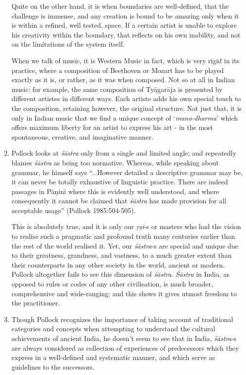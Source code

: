 \begin{enumerate}
Quite on the other hand, it is when boundaries are well-defined, that the challenge is immense, and any creation is bound to be amazing only when it is within a refined, well tested, space. If a certain artist is unable to explore his creativity within the boundary, that reflects on his own inability, and not on the limitations of the system itself. 

When we talk of music, it is Western Music in fact, which is very rigid in its practice, where a composition of Beethoven or Mozart has to be played exactly as it is, or rather, as it was when composed. Not so at all in Indian music: for example, the same composition of Tyāgarāja is presented by different artistes in different ways. Each artiste adds his own special touch to the composition, retaining however, the original structure. Not just that, it is only in Indian music that we find a unique concept of `{\it mano-dharma}' which offers maximum liberty for an artist to express his art - in the most spontaneous, creative, and imaginative manner. 

\item Pollock looks at {\it śāstra} only from a single and limited angle; and repeatedly blames {\it śāstra} as being too normative. Whereas, while speaking about grammar, he himself says ``...However detailed a descriptive grammar may be, it can never be totally exhaustive of linguistic practice. There are indeed passages in Pāṇini where this is evidently well understood, and where consequently it cannot be claimed that {\it śāstra} has made provision for all acceptable usage'' (Pollock 1985:504-505). 

This is absolutely true, and it is only our {\it ṛṣi}-s or masters who had the vision to realise such a pragmatic and profound truth many centuries earlier than the rest of the world realised it.  Yet, our {\it śāstra}-s are special and unique due to their greatness, grandness, and vastness, to a much greater extent than their counterparts in any other society in the world, ancient or modern. Pollock altogether fails to see this dimension of {\it śāstra}. {\it Śāstra} in India, as opposed to rules or codes of any other civilisation, is much broader, comprehensive and wide-ranging; and this shows it gives utmost freedom to the practitioner.

\item Though Pollock recognizes the importance of taking account of traditional categories and concepts when attempting to understand the cultural achievements of ancient India, he doesn't seem to see that in India, {\it śāstra}-s are always considered as collection of experiences of predecessors which they express in a well-defined and systematic manner, and which serve as guidelines to the successors. 


\end{enumerate}
